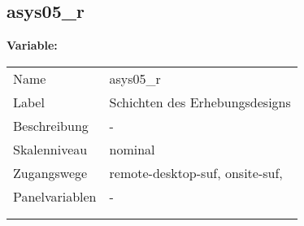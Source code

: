 	
	
	\subsection{asys05\_r}
	\label{subSection:asys05_r}

	\noindent\textbf{Variable:}\\
		\begin{tabular}{lL{11.3cm}}
			\label{tableVariable:asys05_r}
			Name & asys05\_r \\
			Label & Schichten des Erhebungsdesigns \\
			Beschreibung & - \\
			Skalenniveau & nominal \\
			Zugangswege &
				remote-desktop-suf,
				onsite-suf,
 \\
			Panelvariablen & -
			 \\
			 \\
 \\
		\end{tabular}







